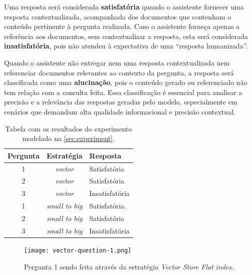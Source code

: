 \documentclass[a4paper, 12pt]{article}
\begin{document}
    Uma resposta será considerada \textbf{satisfatória} quando o assistente fornecer uma resposta contextualizada, acompanhada dos documentos que contenham o conteúdo pertinente à pergunta realizada. Caso o assistente forneça apenas a referência aos documentos, sem contextualizar a resposta, esta será considerada \textbf{insatisfatória}, pois não atendeu à expectativa de uma ``resposta humanizada''.

    Quando o assistente não entregar nem uma resposta contextualizada nem referenciar documentos relevantes ao contexto da pergunta, a resposta será classificada como uma \textbf{alucinação}, pois o conteúdo gerado ou referenciado não tem relação com a consulta feita. Essa classificação é essencial para analisar a precisão e a relevância das respostas geradas pelo modelo, especialmente em cenários que demandam alta qualidade informacional e precisão contextual.
    
    \begin{center}
        \begin{table}[h!]
        \centering
        \renewcommand{\arraystretch}{1.5} %
        \setlength{\tabcolsep}{8pt} %
        \begin{tabular}{|c|c|l|}
        \hline
        \textbf{Pergunta} & \textbf{Estratégia} & \textbf{Resposta} \\ \hline
         1                & \textit{vector}        & Satisfatória   \\ \hline
         2                & \textit{vector}        & Satisfatória   \\ \hline
         3                & \textit{vector}        & Insatisfatória \\ \hline
         1                & \textit{small to big}  & Satisfatória.  \\ \hline
         2                & \textit{small to big}  & Satisfatória   \\ \hline
         3                & \textit{small to big}  & Insatisfatória \\ \hline
        \end{tabular}
        \caption{Tabela com os resultados do experimento modelado na \autoref{sec:experiment}.}
        \label{tab:results}
        \end{table}
    \end{center}

    \clearpage
    
    \begin{figure}[ht]
        \texttt{[image: vector-question-1.png]}
        \centering
        \caption{Pergunta 1 sendo feita através da estratégia \textit{Vector Store Flat index}.}
        \centering
        \label{fig:satisfactory-question}
    \end{figure}
    
\end{document}
